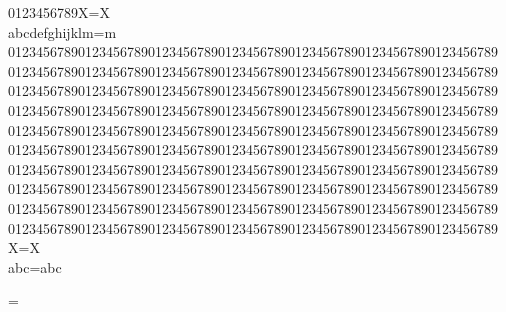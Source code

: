 0123456789X=X\\
abcdefghijklm=m\\
%
0123456789012345678901234567890123456789012345678901234567890123456789%
0123456789012345678901234567890123456789012345678901234567890123456789%
0123456789012345678901234567890123456789012345678901234567890123456789%
0123456789012345678901234567890123456789012345678901234567890123456789%
0123456789012345678901234567890123456789012345678901234567890123456789%
0123456789012345678901234567890123456789012345678901234567890123456789%
0123456789012345678901234567890123456789012345678901234567890123456789%
0123456789012345678901234567890123456789012345678901234567890123456789%
0123456789012345678901234567890123456789012345678901234567890123456789%
0123456789012345678901234567890123456789012345678901234567890123456789%
X=X\\
abc=abc\\
\par\par\relax=\relax\\

